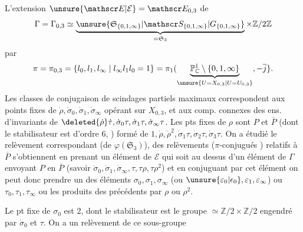 L'extension $\unsure{\mathscr E|\mathcal E}=\mathscr E_{0,3}$ de
\[
\Gamma=\Gamma_{0,3}\simeq\underbrace{\unsure{\mathfrak S_{\{0,1,\infty\}}|\mathscr S_{\{0,1,\infty\}}|G_{\{0,1,\infty\}}}}_{=\mathfrak S_3}\times\mathbb Z/2\mathbb Z
\]
par
\[
\pi=\pi_{0,3}=\{l_0,l_1,l_\infty\mid l_\infty l_1l_0=1\}=\pi_1(\underbrace{\mathbb P^1_{\mathbb C}\setminus\{0,1,\infty\}}_{\unsure{U=X_{0,3}|U=U_{0,3}}},-\overline j\}.
\]
Les classes de conjugaison  de scindages partiels maximaux correspondent aux points fixes de $\dot\rho,\dot\sigma_0,\dot\sigma_1,\dot\sigma_\infty$ opérant sur $X_{0,3}$, et aux comp. connexes des ens. d'invariants  de $\deleted{\dot\rho}\dot\tau,\dot\sigma_0\tau,\dot\sigma_1\tau,\dot\sigma_\infty\tau$. Les pts fixes de $\rho$ sont $P$ et $\overline P$ (dont le stabilisateur est d'ordre 6, ) formé de $1,\dot\rho,\dot\rho^2,\dot\sigma_1\tau,\dot\sigma_2\tau,\dot\sigma_3\tau$. On a étudié le relèvement correspondant  (de $\varphi(\mathfrak S_3)$),  des relèvements ($\pi$-conjugués ) relatifs à $\overline P$ s'obtiennent en  prenant un élément de $\mathscr E$  qui soit au dessus d'un élément de $\Gamma$ envoyant $P$ en $\overline P$ (savoir $\dot\sigma_0,\dot\sigma_1,\dot\sigma_\infty,\tau,\tau\rho,\tau\rho^2$) et en conjuguant par cet élément on peut donc prendre  un des éléments $\sigma_0,\sigma_1,\sigma_\infty$ (ou $\unsure{\varepsilon_0|\epsilon_0},\varepsilon_1,\varepsilon_\infty$) ou $\tau_0,\tau_1,\tau_\infty$ ou les produits des précédents par  $\rho$ ou $\rho^2$.

Le  pt fixe de $\sigma_0$ est 2, dont le stabilisateur est le groupe $\simeq\mathbb Z/2\times\mathbb Z/2$ engendré par $\dot\sigma_0$ et $\tau$. On a un relèvement de ce sous-groupe
